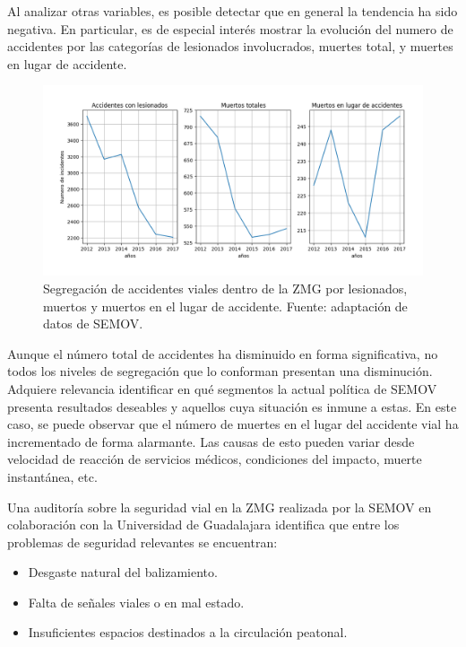 \documentclass{article}
\begin{document}
Al analizar otras variables, es posible detectar que en general la tendencia ha sido negativa.
En particular, es de especial interés mostrar la evolución del numero de accidentes por las
categorías de lesionados involucrados, muertes total, y muertes en lugar de accidente.

	\begin{figure}[H]\centering
	\includegraphics[width=1\textwidth]{resources/img/accidentes_general_segregacion_img.png}
	\caption{\label{fig:accidentes_general_segregacion_img} Segregación de accidentes viales dentro de la ZMG por lesionados, muertos y muertos en el lugar de accidente. Fuente: adaptación de datos de SEMOV.}
    \end{figure}

Aunque el número total de accidentes ha disminuido en forma significativa,
no todos los niveles de segregación que lo conforman presentan una disminución.
Adquiere relevancia identificar en qué segmentos la actual política de SEMOV presenta
resultados deseables y aquellos cuya situación es inmune a estas.
En este caso, se puede observar que el número de muertes en el lugar del accidente
vial ha incrementado de forma alarmante. Las causas de esto pueden variar desde
velocidad de reacción de servicios médicos, condiciones del impacto, muerte instantánea,
etc.

Una auditoría sobre la seguridad vial en la ZMG realizada por la SEMOV en colaboración con la Universidad de Guadalajara
identifica que entre los problemas de seguridad relevantes se encuentran:

	\begin{itemize}
		\item Desgaste natural del balizamiento.
		\item Falta de señales viales o en mal estado.
		\item Insuficientes espacios destinados a la circulación peatonal.
	\end{itemize}
\end{document}
